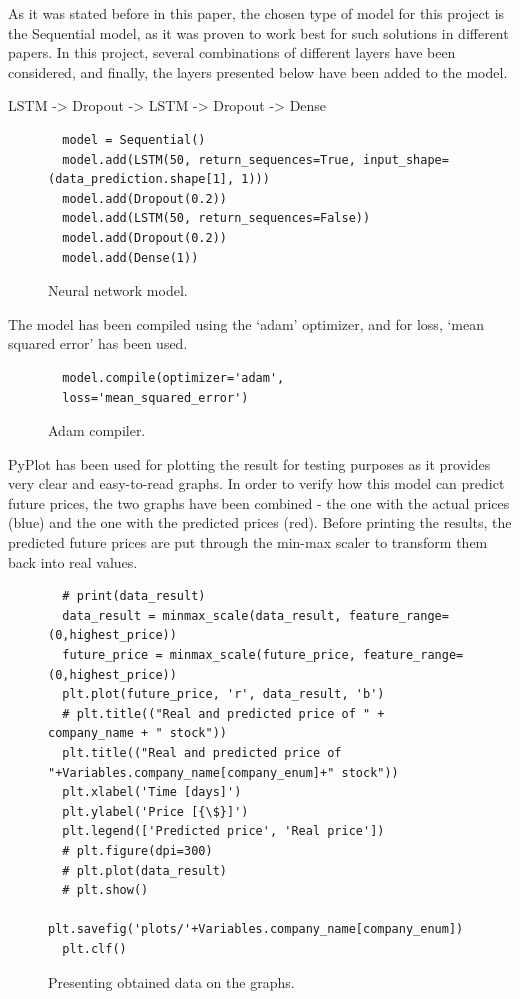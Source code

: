 As it was stated before in this paper, the chosen type of model for this project is the Sequential model, as it was proven to work best for such solutions in different papers. In this project, several combinations of different layers have been considered, and finally, the layers presented below have been added to the model.
\par

LSTM -> Dropout -> LSTM -> Dropout -> Dense
\clearpage
\begin{figure}
\centering
\begin{lstlisting}
  model = Sequential()
  model.add(LSTM(50, return_sequences=True, input_shape=(data_prediction.shape[1], 1)))
  model.add(Dropout(0.2))
  model.add(LSTM(50, return_sequences=False))
  model.add(Dropout(0.2))
  model.add(Dense(1))
\end{lstlisting}
\caption{Neural network model.}
\label{fig:pseudocode:listings}
\end{figure}

The model has been compiled using the ‘adam’ optimizer, and for loss, ‘mean squared error’ has been used.
\clearpage
\begin{figure}
\centering
\begin{lstlisting}
  model.compile(optimizer='adam',
  loss='mean_squared_error')
\end{lstlisting}
\caption{Adam compiler.}
\label{fig:pseudocode:listings}
\end{figure}

PyPlot has been used for plotting the result for testing purposes as it provides very clear and easy-to-read graphs. In order to verify how this model can predict future prices, the two graphs have been combined - the one with the actual prices (blue) and the one with the predicted prices (red). Before printing the results, the predicted future prices are put through the min-max scaler to transform them back into real values.
\clearpage
\begin{figure}
\centering
\begin{lstlisting}
  # print(data_result)
  data_result = minmax_scale(data_result, feature_range=(0,highest_price))
  future_price = minmax_scale(future_price, feature_range=(0,highest_price))
  plt.plot(future_price, 'r', data_result, 'b')
  # plt.title(("Real and predicted price of " + company_name + " stock"))
  plt.title(("Real and predicted price of "+Variables.company_name[company_enum]+" stock"))
  plt.xlabel('Time [days]')
  plt.ylabel('Price [{\$}]')
  plt.legend(['Predicted price', 'Real price'])
  # plt.figure(dpi=300)
  # plt.plot(data_result)
  # plt.show()
  plt.savefig('plots/'+Variables.company_name[company_enum])
  plt.clf()
\end{lstlisting}
\caption{Presenting obtained data on the graphs.}
\label{fig:pseudocode:listings}
\end{figure}

